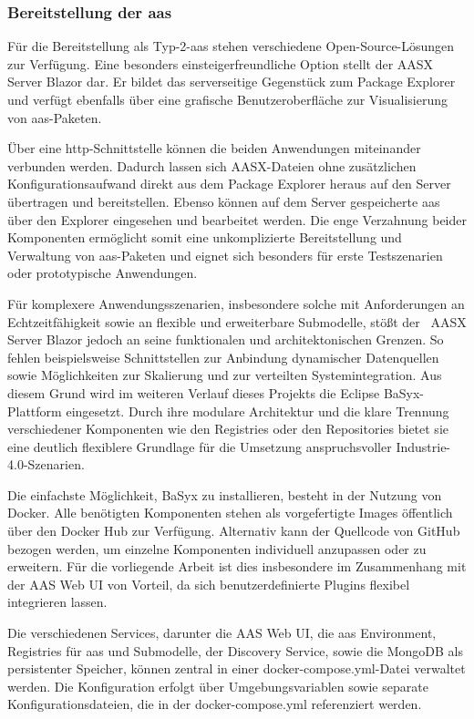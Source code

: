 \subsubsection{Bereitstellung der \acs{aas}}
\label{sec:bereitstellungAAS}
Für die Bereitstellung als Typ-2-\acs{aas} stehen verschiedene Open-Source-Lösungen zur Verfügung. 
Eine besonders einsteigerfreundliche Option stellt der AASX Server Blazor \cite{AASXServer} dar.
Er bildet das serverseitige Gegenstück zum Package Explorer und verfügt ebenfalls über eine grafische Benutzeroberfläche zur Visualisierung von \acs{aas}-Paketen.

Über eine \acs{http}-Schnittstelle können die beiden Anwendungen miteinander verbunden werden.
Dadurch lassen sich AASX-Dateien ohne zusätzlichen Konfigurationsaufwand direkt aus dem Package Explorer heraus auf den Server übertragen und bereitstellen.
Ebenso können auf dem Server gespeicherte \acs{aas} über den Explorer eingesehen und bearbeitet werden.
Die enge Verzahnung beider Komponenten ermöglicht somit eine unkomplizierte Bereitstellung und Verwaltung von \acs{aas}-Paketen und eignet sich besonders für erste Testszenarien oder prototypische Anwendungen.

Für komplexere Anwendungsszenarien, insbesondere solche mit Anforderungen an Echtzeitfähigkeit sowie an flexible und erweiterbare Submodelle, stößt der%
\pagebreak
~AASX Server Blazor jedoch an seine funktionalen und architektonischen Grenzen. 
So fehlen beispielsweise Schnittstellen zur Anbindung dynamischer Datenquellen sowie Möglichkeiten zur Skalierung und zur verteilten Systemintegration.
Aus diesem Grund wird im weiteren Verlauf dieses Projekts die Eclipse BaSyx-Plattform eingesetzt.
Durch ihre modulare Architektur und die klare Trennung verschiedener Komponenten wie den Registries oder den Repositories bietet sie eine deutlich flexiblere Grundlage für die Umsetzung anspruchsvoller Industrie-4.0-Szenarien.

Die einfachste Möglichkeit, BaSyx zu installieren, besteht in der Nutzung von Docker.
Alle benötigten Komponenten stehen als vorgefertigte Images öffentlich über den Docker Hub \cite{BaSyxDockerHub} zur Verfügung. 
Alternativ kann der Quellcode von GitHub \cite{BaSyxGithub} bezogen werden, um einzelne Komponenten individuell anzupassen oder zu erweitern.
Für die vorliegende Arbeit ist dies insbesondere im Zusammenhang mit der AAS Web UI von Vorteil, da sich benutzerdefinierte Plugins flexibel integrieren lassen.

Die verschiedenen Services, darunter die AAS Web UI, die \acs{aas} Environment, Registries für \acs{aas} und Submodelle, der Discovery Service, sowie die MongoDB als persistenter Speicher, können zentral in einer docker-compose.yml-Datei verwaltet werden.
Die Konfiguration erfolgt über Umgebungsvariablen sowie separate Konfigurationsdateien, die in der docker-compose.yml referenziert werden.

